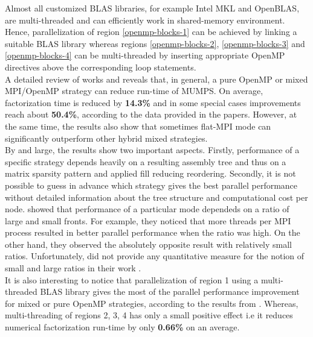Almost all customized BLAS libraries, for example Intel MKL and OpenBLAS, are multi-threaded and can efficiently work in shared-memory environment. Hence, parallelization of region \ref{openmp-blocks-1} can be achieved by linking a suitable BLAS library whereas regions \ref{openmp-blocks-2}, \ref{openmp-blocks-3} and \ref{openmp-blocks-4} can be multi-threaded by inserting appropriate OpenMP directives above the corresponding loop statements.\\


A detailed review of works \cite{l2013introduction} and \cite{chowdhury2010some} reveals that, in general, a pure OpenMP or mixed MPI/OpenMP strategy can reduce run-time of MUMPS. On average, factorization time is reduced by \textbf{14.3\%} and in some special cases improvements reach about \textbf{50.4\%}, according to the data provided in the papers. However, at the same time, the results also show that sometimes flat-MPI mode can significantly outperform other hybrid mixed strategies.\\


By and large, the results show two important aspects. Firstly, performance of a specific strategy depends heavily on a resulting assembly tree and thus on a matrix sparsity pattern and applied fill reducing reordering. Secondly, it is not possible to guess in advance which strategy gives the best parallel performance without detailed information about the tree structure and computational cost per node. \citeauthor{l2013introduction} showed that performance of a particular mode dependeds on a ratio of large and small fronts. For example, they noticed that more threads per MPI process resulted in better parallel performance when the ratio was high. On the other hand, they observed the absolutely opposite result with relatively small ratios. Unfortunately, \citeauthor{l2013introduction} did not provide any quantitative measure for the notion of small and large ratios in their work \cite{l2013introduction}.\\ 


It is also interesting to notice that parallelization of region 1 using a multi-threaded BLAS library gives the most of the parallel performance improvement for mixed or pure OpenMP strategies, according to the results from \cite{l2013introduction}. Whereas,
multi-threading of regions 2, 3, 4 has only a small positive effect i.e it reduces numerical factorization run-time by only \textbf{0.66\%} on an average.\\



